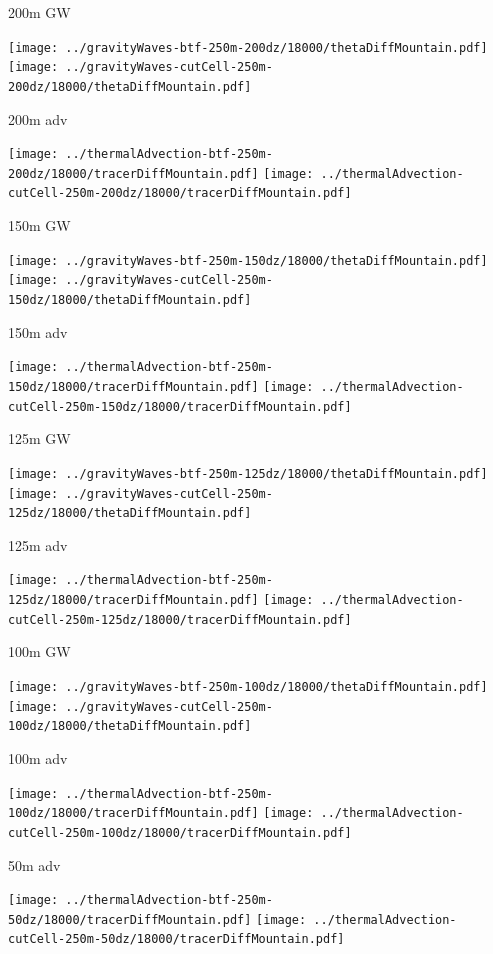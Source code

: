 \documentclass{article}
\begin{document}
\newpage
200m GW

\texttt{[image: ../gravityWaves-btf-250m-200dz/18000/thetaDiffMountain.pdf]}
\texttt{[image: ../gravityWaves-cutCell-250m-200dz/18000/thetaDiffMountain.pdf]}

200m adv

\texttt{[image: ../thermalAdvection-btf-250m-200dz/18000/tracerDiffMountain.pdf]}
\texttt{[image: ../thermalAdvection-cutCell-250m-200dz/18000/tracerDiffMountain.pdf]}

\newpage
150m GW

\texttt{[image: ../gravityWaves-btf-250m-150dz/18000/thetaDiffMountain.pdf]}
\texttt{[image: ../gravityWaves-cutCell-250m-150dz/18000/thetaDiffMountain.pdf]}

150m adv

\texttt{[image: ../thermalAdvection-btf-250m-150dz/18000/tracerDiffMountain.pdf]}
\texttt{[image: ../thermalAdvection-cutCell-250m-150dz/18000/tracerDiffMountain.pdf]}

\newpage

125m GW

\texttt{[image: ../gravityWaves-btf-250m-125dz/18000/thetaDiffMountain.pdf]}
\texttt{[image: ../gravityWaves-cutCell-250m-125dz/18000/thetaDiffMountain.pdf]}

125m adv

\texttt{[image: ../thermalAdvection-btf-250m-125dz/18000/tracerDiffMountain.pdf]}
\texttt{[image: ../thermalAdvection-cutCell-250m-125dz/18000/tracerDiffMountain.pdf]}

\newpage

100m GW

\texttt{[image: ../gravityWaves-btf-250m-100dz/18000/thetaDiffMountain.pdf]}
\texttt{[image: ../gravityWaves-cutCell-250m-100dz/18000/thetaDiffMountain.pdf]}

100m adv

\texttt{[image: ../thermalAdvection-btf-250m-100dz/18000/tracerDiffMountain.pdf]}
\texttt{[image: ../thermalAdvection-cutCell-250m-100dz/18000/tracerDiffMountain.pdf]}

\newpage

50m adv

\texttt{[image: ../thermalAdvection-btf-250m-50dz/18000/tracerDiffMountain.pdf]}
\texttt{[image: ../thermalAdvection-cutCell-250m-50dz/18000/tracerDiffMountain.pdf]}
\end{document}
